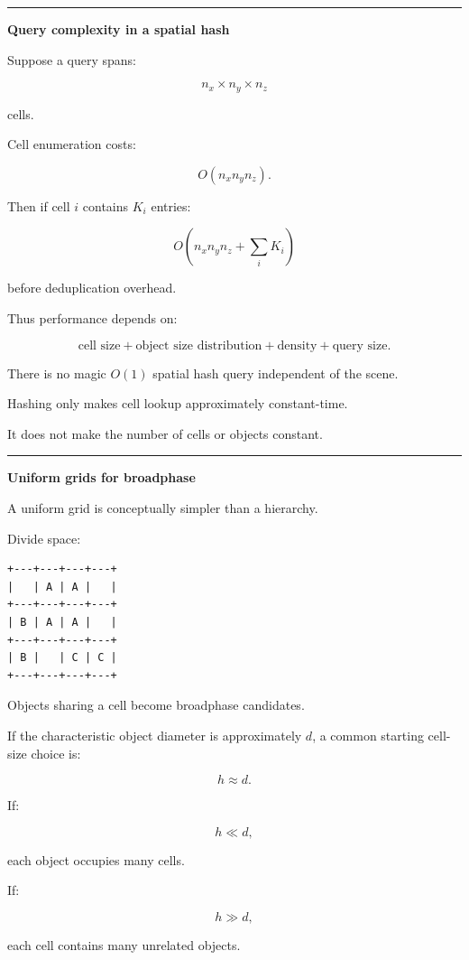 \begin{center}\rule{0.5\linewidth}{0.5pt}\end{center}

\textbf{Query complexity in a spatial hash}

Suppose a query spans:

\[
n_x\times n_y\times n_z
\]

cells.

Cell enumeration costs:

\[
O(n_xn_yn_z).
\]

Then if cell \(i\) contains \(K_i\) entries:

\[
O\left(
n_xn_yn_z
+
\sum_iK_i
\right)
\]

before deduplication overhead.

Thus performance depends on:

\[
\boxed{
\text{cell size}
+
\text{object size distribution}
+
\text{density}
+
\text{query size}.
}
\]

There is no magic \(O(1)\) spatial hash query independent of the scene.

Hashing only makes cell lookup approximately constant-time.

It does not make the number of cells or objects constant.

\begin{center}\rule{0.5\linewidth}{0.5pt}\end{center}

\textbf{Uniform grids for broadphase}

A uniform grid is conceptually simpler than a hierarchy.

Divide space:

\begin{verbatim}
+---+---+---+---+
|   | A | A |   |
+---+---+---+---+
| B | A | A |   |
+---+---+---+---+
| B |   | C | C |
+---+---+---+---+
\end{verbatim}

Objects sharing a cell become broadphase candidates.

If the characteristic object diameter is approximately \(d\), a common starting cell-size choice is:

\[
h\approx d.
\]

If:

\[
h\ll d,
\]

each object occupies many cells.

If:

\[
h\gg d,
\]

each cell contains many unrelated objects.

